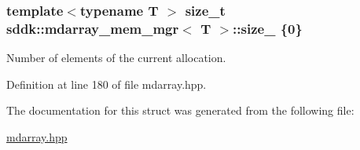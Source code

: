 \subsubsection[{size\+\_\+}]{\setlength{\rightskip}{0pt plus 5cm}template$<$typename T $>$ size\+\_\+t {\bf sddk\+::mdarray\+\_\+mem\+\_\+mgr}$<$ T $>$\+::size\+\_\+ \{0\}}\label{structsddk_1_1mdarray__mem__mgr_af4fdc0b787515b21c2aa3460b6512c8e}


Number of elements of the current allocation. 



Definition at line 180 of file mdarray.\+hpp.



The documentation for this struct was generated from the following file\+:\begin{DoxyCompactItemize}
\item 
\hyperlink{mdarray_8hpp}{mdarray.\+hpp}\end{DoxyCompactItemize}
